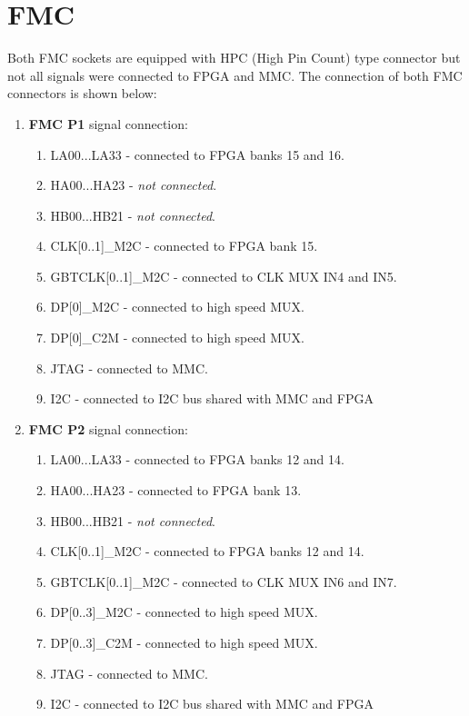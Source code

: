 \documentclass[12pt,oneside,a4]{article}
\begin{document}
\section{FMC}
Both FMC sockets are equipped with HPC (High Pin Count) type connector but not all signals were connected to FPGA and MMC.
The connection of both FMC connectors is shown below:
\begin{enumerate}
    \item \textbf{FMC P1} signal connection:
    \begin{enumerate}
        \item LA00...LA33 - connected to FPGA banks 15 and 16.
        \item HA00...HA23 - \textit{not connected}.
        \item HB00...HB21 - \textit{not connected}.
        \item CLK[0..1]\_M2C - connected to FPGA bank 15.
        \item GBTCLK[0..1]\_M2C - connected to CLK MUX IN4 and IN5.
        \item DP[0]\_M2C - connected to high speed MUX.
        \item DP[0]\_C2M - connected to high speed MUX.
        \item JTAG - connected to MMC.
        \item I2C - connected to I2C bus shared with MMC and FPGA
    \end{enumerate}
    \item \textbf{FMC P2} signal connection:
    \begin{enumerate}
        \item LA00...LA33 - connected to FPGA banks 12 and 14.
        \item HA00...HA23 - connected to FPGA bank 13.
        \item HB00...HB21 - \textit{not connected}.
        \item CLK[0..1]\_M2C - connected to FPGA banks 12 and 14.
        \item GBTCLK[0..1]\_M2C - connected to CLK MUX IN6 and IN7.
        \item DP[0..3]\_M2C - connected to high speed MUX.
        \item DP[0..3]\_C2M - connected to high speed MUX.
        \item JTAG - connected to MMC.
        \item I2C - connected to I2C bus shared with MMC and FPGA
    \end{enumerate}
\end{enumerate}
\end{document}
